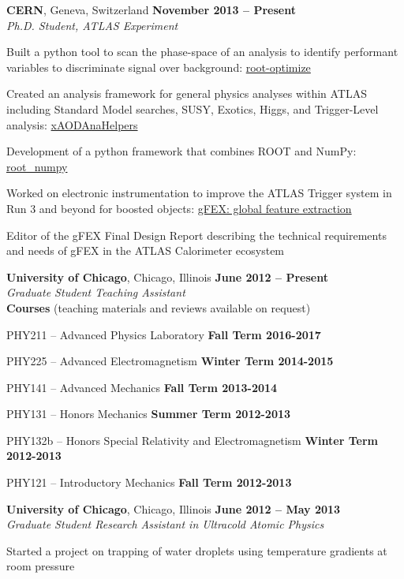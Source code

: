 \documentclass[margin,line]{resume}
\begin{document}
\begin{resume}
\textbf{CERN}, Geneva, Switzerland \hfill \textbf{November 2013 -- Present}\\
\textsl{Ph.D. Student, ATLAS Experiment}
\begin{list2}
  \item Built a python tool to scan the phase-space of an analysis to identify performant variables to discriminate signal over background: \href{https://github.com/kratsg/Optimization}{root-optimize}
  \item Created an analysis framework for general physics analyses within ATLAS including Standard Model searches, SUSY, Exotics, Higgs, and Trigger-Level analysis: \href{https://xaodanahelpers.readthedocs.io/en/master/}{xAODAnaHelpers}
  \item Development of a python framework that combines ROOT and NumPy: \href{http://scikit-hep.org/root_numpy/}{root\_numpy}
  \item Worked on electronic instrumentation to improve the ATLAS Trigger system in Run 3 and beyond for boosted objects: \href{https://gfex.cern.ch/}{gFEX: global feature extraction}
  \item Editor of the gFEX Final Design Report describing the technical requirements and needs of gFEX in the ATLAS Calorimeter ecosystem
\end{list2}

\textbf{University of Chicago}, Chicago, Illinois \hfill \textbf{June 2012 -- Present}\\
\textsl{Graduate Student Teaching Assistant}\\
\textbf{Courses} (teaching materials and reviews available on request)
\begin{list2}
  \item PHY211 -- Advanced Physics Laboratory \hfill \textbf{Fall Term 2016-2017}
  \item PHY225 -- Advanced Electromagnetism \hfill \textbf{Winter Term 2014-2015}
  \item PHY141 -- Advanced Mechanics \hfill \textbf{Fall Term 2013-2014}
  \item PHY131 -- Honors Mechanics \hfill \textbf{Summer Term 2012-2013}
  \item PHY132b -- Honors Special Relativity and Electromagnetism \hfill \textbf{Winter Term 2012-2013}
  \item PHY121 -- Introductory Mechanics \hfill \textbf{Fall Term 2012-2013}
\end{list2}

\textbf{University of Chicago}, Chicago, Illinois  \hfill \textbf{June 2012 -- May 2013}\\
\textsl{Graduate Student Research Assistant in Ultracold Atomic Physics}
\begin{list2}
  \item Started a project on trapping of water droplets using temperature gradients at room pressure
\end{list2}


\end{resume}
\end{document}
